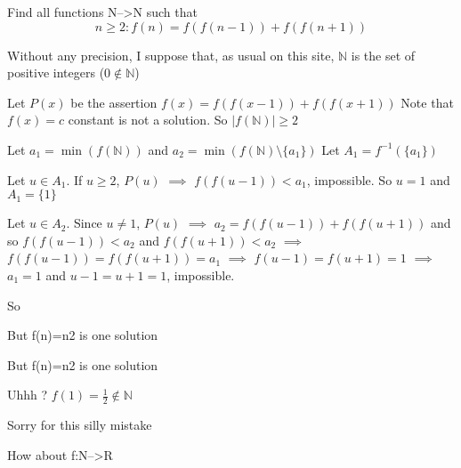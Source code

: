 \begin{solution}
	\begin{tcolorbox}Find all functions N-->N such that
\[n\geq2 : f(n)=f(f(n-1))+f(f(n+1))\]\end{tcolorbox}
Without any precision, I suppose that, as usual on this site, $\mathbb N$ is the set of positive integers ($0\notin\mathbb N$)

Let $P(x)$ be the assertion $f(x)=f(f(x-1))+f(f(x+1))$
Note that $f(x)=c$ constant is not a solution. So $|f(\mathbb N)|\ge 2$

Let $a_1=\min(f(\mathbb N))$ and $a_2=\min(f(\mathbb N)\setminus\{a_1\})$
Let $A_1=f^{-1}(\{a_1\})$

Let $u\in A_1$. If $u\ge 2$, $P(u)$ $\implies$ $f(f(u-1))<a_1$, impossible. So $u=1$ and $A_1=\{1\}$

Let $u\in A_2$. Since $u\ne 1$, $P(u)$ $\implies$ $a_2=f(f(u-1))+f(f(u+1))$ and so $f(f(u-1))<a_2$ and $f(f(u+1))<a_2$
$\implies$ $f(f(u-1))=f(f(u+1))=a_1$
$\implies$ $f(u-1)=f(u+1)=1$
$\implies$ $a_1=1$ and $u-1=u+1=1$, impossible.

So 
\end{solution}



\begin{solution}
	But f(n)=n\/2 is one solution
\end{solution}



\begin{solution}
	\begin{tcolorbox}But f(n)=n\/2 is one solution\end{tcolorbox}
Uhhh ? $f(1)=\frac 12\notin\mathbb N$
\end{solution}



\begin{solution}
	Sorry for this silly mistake
\end{solution}



\begin{solution}
	How about f:N-->R
\end{solution}



